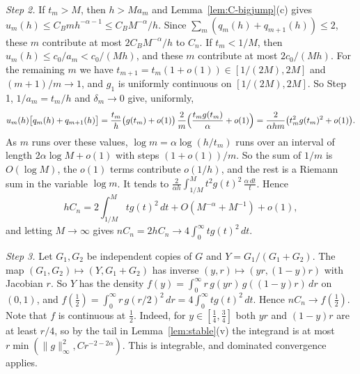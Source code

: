 \emph{Step 2.} If $t_m>M$, then $h>Ma_m$ and Lemma~\ref{lem:C-bigjump}(c)
gives $u_m(h)\le C_Bmh^{-\alpha-1}\le C_BM^{-\alpha}/h$. Since
$\sum_m(q_m(h)+q_{m+1}(h))\le2$, these $m$ contribute at most
$2C_BM^{-\alpha}/h$ to $C_n$. If $t_m<1/M$, then $u_m(h)\le c_0/a_m<c_0/(Mh)$,
and these $m$ contribute at most $2c_0/(Mh)$. For the remaining $m$ we have
$t_{m+1}=t_m(1+o(1))\in[1/(2M),2M]$ and $(m+1)/m\to1$, and $g_1$ is uniformly
continuous on $[1/(2M),2M]$. So Step 1, $1/a_m=t_m/h$ and $\delta_m\to0$ give,
uniformly,
\[
u_m(h)\bigl[q_m(h)+q_{m+1}(h)\bigr]
=\frac{t_m}h\bigl(g(t_m)+o(1)\bigr)\,\frac2m\Bigl(\frac{t_mg(t_m)}\alpha+o(1)\Bigr)
=\frac2{\alpha hm}\bigl(t_m^2g(t_m)^2+o(1)\bigr).
\]
As $m$ runs over these values, $\log m=\alpha\log(h/t_m)$ runs over an
interval of length $2\alpha\log M+o(1)$ with steps $(1+o(1))/m$. So the sum of
$1/m$ is $O(\log M)$, the $o(1)$ terms contribute $o(1/h)$, and the rest is a
Riemann sum in the variable $\log m$. It tends to
$\frac2{\alpha h}\int_{1/M}^Mt^2g(t)^2\,\frac{\alpha\,dt}t$. Hence
\[
hC_n=2\int_{1/M}^Mtg(t)^2\,dt+O(M^{-\alpha}+M^{-1})+o(1),
\]
and letting $M\to\infty$ gives $nC_n=2hC_n\to4\int_0^\infty tg(t)^2\,dt$.

\emph{Step 3.} Let $G_1,G_2$ be independent copies of $G$ and
$Y=G_1/(G_1+G_2)$. The map $(G_1,G_2)\mapsto(Y,G_1+G_2)$ has inverse
$(y,r)\mapsto(yr,(1-y)r)$ with Jacobian $r$. So $Y$ has the density
$f(y)=\int_0^\infty r\,g(yr)\,g((1-y)r)\,dr$ on $(0,1)$, and
$f(\frac12)=\int_0^\infty r\,g(r/2)^2\,dr=4\int_0^\infty tg(t)^2\,dt$. Hence
$nC_n\to f(\frac12)$. Note that $f$ is continuous at $\frac12$. Indeed, for
$y\in[\frac14,\frac34]$ both $yr$ and $(1-y)r$ are at least $r/4$, so by the
tail in Lemma~\ref{lem:stable}(v) the integrand is at most
$r\min(\lVert g\rVert_\infty^2,Cr^{-2-2\alpha})$. This is integrable, and
dominated convergence applies.

